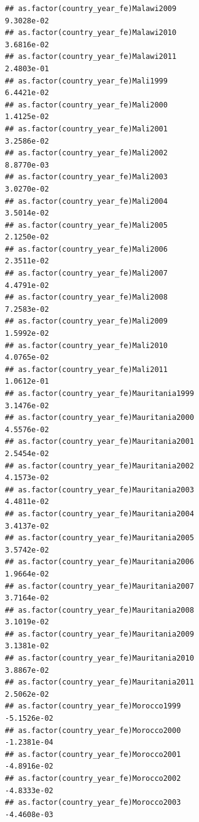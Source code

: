 \documentclass[
  a4paper,
]{article}
\begin{document}
\begin{verbatim}
## as.factor(country_year_fe)Malawi2009                            9.3028e-02
## as.factor(country_year_fe)Malawi2010                            3.6816e-02
## as.factor(country_year_fe)Malawi2011                            2.4803e-01
## as.factor(country_year_fe)Mali1999                              6.4421e-02
## as.factor(country_year_fe)Mali2000                              1.4125e-02
## as.factor(country_year_fe)Mali2001                              3.2586e-02
## as.factor(country_year_fe)Mali2002                              8.8770e-03
## as.factor(country_year_fe)Mali2003                              3.0270e-02
## as.factor(country_year_fe)Mali2004                              3.5014e-02
## as.factor(country_year_fe)Mali2005                              2.1250e-02
## as.factor(country_year_fe)Mali2006                              2.3511e-02
## as.factor(country_year_fe)Mali2007                              4.4791e-02
## as.factor(country_year_fe)Mali2008                              7.2583e-02
## as.factor(country_year_fe)Mali2009                              1.5992e-02
## as.factor(country_year_fe)Mali2010                              4.0765e-02
## as.factor(country_year_fe)Mali2011                              1.0612e-01
## as.factor(country_year_fe)Mauritania1999                        3.1476e-02
## as.factor(country_year_fe)Mauritania2000                        4.5576e-02
## as.factor(country_year_fe)Mauritania2001                        2.5454e-02
## as.factor(country_year_fe)Mauritania2002                        4.1573e-02
## as.factor(country_year_fe)Mauritania2003                        4.4811e-02
## as.factor(country_year_fe)Mauritania2004                        3.4137e-02
## as.factor(country_year_fe)Mauritania2005                        3.5742e-02
## as.factor(country_year_fe)Mauritania2006                        1.9664e-02
## as.factor(country_year_fe)Mauritania2007                        3.7164e-02
## as.factor(country_year_fe)Mauritania2008                        3.1019e-02
## as.factor(country_year_fe)Mauritania2009                        3.1381e-02
## as.factor(country_year_fe)Mauritania2010                        3.8867e-02
## as.factor(country_year_fe)Mauritania2011                        2.5062e-02
## as.factor(country_year_fe)Morocco1999                          -5.1526e-02
## as.factor(country_year_fe)Morocco2000                          -1.2381e-04
## as.factor(country_year_fe)Morocco2001                          -4.8916e-02
## as.factor(country_year_fe)Morocco2002                          -4.8333e-02
## as.factor(country_year_fe)Morocco2003                          -4.4608e-03

\end{verbatim}
\end{document}
